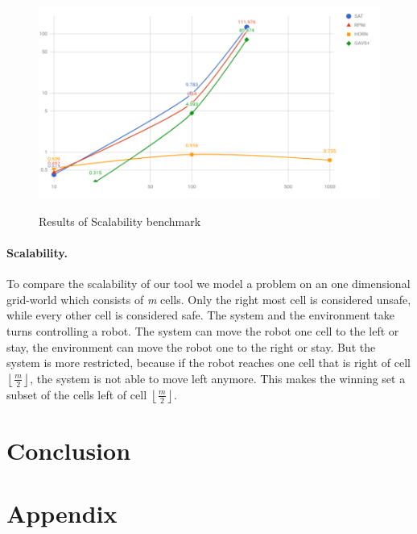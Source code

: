 \documentclass[10pt,a4paper]{article}
\theoremstyle{plain}
\theoremstyle{definition}
\begin{document}
\begin{figure}[h]
  \caption{Results of Scalability benchmark}
  \centering
    {\includegraphics[width=16.0cm]{experiments.png}} 
\end{figure}


\paragraph*{Scalability.} To compare the scalability of our tool we model a problem on an one dimensional grid-world which consists of \emph{m} cells. Only the right most cell is considered unsafe, while every other cell is considered safe. The system and the environment take turns controlling a robot. The system can move the robot one cell to the left or stay, the environment can move the robot one to the right or stay. But the system is more restricted, because if the robot reaches one cell that is right of cell $\left \lfloor{\frac{m}{2}}\right \rfloor $, the system is not able to move left anymore. This makes the winning set a subset of the cells left of cell $\left \lfloor{\frac{m}{2}}\right \rfloor $.
\newpage
\section{Conclusion}

\newpage


\newpage
\appendix
\section{Appendix}
\end{document}
